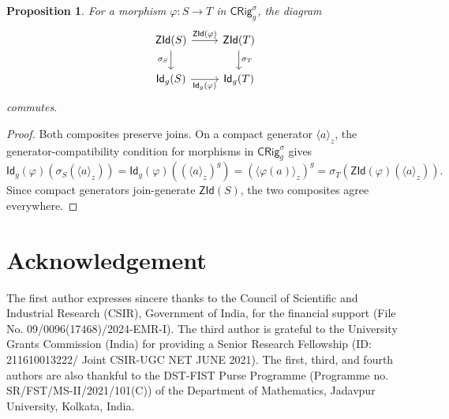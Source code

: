 \documentclass[11pt,leqno]{amsart}
\theoremstyle{plain}
\newtheorem{proposition}[theorem]{Proposition}
\theoremstyle{definition}
\theoremstyle{remark}
\numberwithin{equation}{section}
\newcommand{\ZId}{\mathsf{ZId}}
\newcommand{\GCl}{\mathsf{Id}_{g}}
\newcommand{\ideal}[1]{\langle #1\rangle}
\begin{document}
\begin{proposition}\label{app:naturality-expanded}
For a morphism $\varphi:S\to T$ in $\mathsf{CRig}_{g}^{\sigma}$,
the diagram
\[
\begin{tikzcd}
\ZId(S) \arrow[r,"\ZId(\varphi)"] \arrow[d,"\sigma_S"'] &
\ZId(T) \arrow[d,"\sigma_T"] \\
\GCl(S) \arrow[r,"\GCl(\varphi)"'] & \GCl(T)
\end{tikzcd}
\]
commutes.
\end{proposition}
\begin{proof}
Both composites preserve joins.
On a compact generator $\ideal{a}_z$,
the generator-compatibility condition for morphisms in
$\mathsf{CRig}_{g}^{\sigma}$ gives
\[
\GCl(\varphi)(\sigma_S(\ideal{a}_z))
=\GCl(\varphi)((\ideal{a}_z)^g)
=(\ideal{\varphi(a)}_z)^g
=\sigma_T(\ZId(\varphi)(\ideal{a}_z)).
\]
Since compact generators join-generate $\ZId(S)$,
the two composites agree everywhere.
\end{proof}


\section*{Acknowledgement}
The first author expresses sincere thanks to the Council of Scientific and Industrial Research (CSIR), Government of India, for the financial support (File No. 09/0096(17468)/2024-EMR-I). The third author is grateful to the University Grants Commission (India) for providing a Senior Research Fellowship (ID:
211610013222/ Joint CSIR-UGC NET JUNE 2021). The first, third, and fourth authors are also thankful to the DST-FIST Purse Programme (Programme no. SR/FST/MS-II/2021/101(C)) of the Department of Mathematics, Jadavpur University, Kolkata, India.
\end{document}
